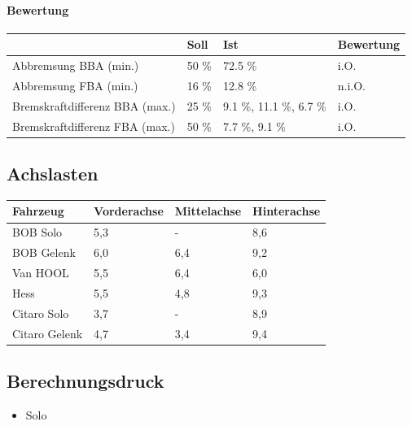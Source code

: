 \documentclass{vorlage-design-main}
\begin{document}
\paragraph{Bewertung}\label{bewertung}

\begin{table}[ht]
  \begin{tabular}{@{}llll@{}}
\toprule
& 
Soll
 & 
Ist
 & 
Bewertung
 \\
\midrule[\heavyrulewidth]
Abbremsung BBA (min.) & 50 \% & 72.5 \% & i.O. \\
Abbremsung FBA (min.) & 16 \% & 12.8 \% & n.i.O. \\
Bremskraftdifferenz BBA (max.) & 25 \% & 9.1 \%, 11.1 \%, 6.7 \% &
i.O. \\
Bremskraftdifferenz FBA (max.) & 50 \% & 7.7 \%, 9.1 \% & i.O. \\
\bottomrule
\end{tabular}%
\end{table}

\subsection{Achslasten}\label{achslasten}

\begin{table}[ht]
  \begin{tabular}{@{}llll@{}}
  \toprule

Fahrzeug & Vorderachse & Mittelachse & Hinterachse \\
\midrule[\heavyrulewidth]
BOB Solo & 5,3 & - & 8,6 \\
BOB Gelenk & 6,0 & 6,4 & 9,2 \\
Van HOOL & 5,5 & 6,4 & 6,0 \\
Hess & 5,5 & 4,8 & 9,3 \\
Citaro Solo & 3,7 & - & 8,9 \\
Citaro Gelenk & 4,7 & 3,4 & 9,4 \\
  \bottomrule
  \end{tabular}%
\end{table}

\subsection{Berechnungsdruck}\label{berechnungsdruck}

\begin{itemize}

\item
  Solo
\end{itemize}
\end{document}
